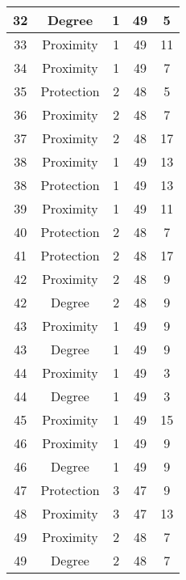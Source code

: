 \documentclass[results.tex]{subfiles}
\begin{document}
\begin{center}
\begin{tabular}{| c || c | c | c | c |}
    \hline
    32 & Degree & 1 & 49 & 5 \\ 
    \hline
    33 & Proximity & 1 & 49 & 11 \\ 
    \hline
    34 & Proximity & 1 & 49 & 7 \\ 
    \hline
    35 & Protection & 2 & 48 & 5 \\ 
    \hline
    36 & Proximity & 2 & 48 & 7 \\ 
    \hline
    37 & Proximity & 2 & 48 & 17 \\ 
    \hline
    38 & Proximity & 1 & 49 & 13 \\ 
    \hline
    38 & Protection & 1 & 49 & 13 \\ 
    \hline
    39 & Proximity & 1 & 49 & 11 \\ 
    \hline
    40 & Protection & 2 & 48 & 7 \\ 
    \hline
    41 & Protection & 2 & 48 & 17 \\ 
    \hline
    42 & Proximity & 2 & 48 & 9 \\ 
    \hline
    42 & Degree & 2 & 48 & 9 \\ 
    \hline
    43 & Proximity & 1 & 49 & 9 \\ 
    \hline
    43 & Degree & 1 & 49 & 9 \\ 
    \hline
    44 & Proximity & 1 & 49 & 3 \\ 
    \hline
    44 & Degree & 1 & 49 & 3 \\ 
    \hline
    45 & Proximity & 1 & 49 & 15 \\ 
    \hline
    46 & Proximity & 1 & 49 & 9 \\ 
    \hline
    46 & Degree & 1 & 49 & 9 \\ 
    \hline
    47 & Protection & 3 & 47 & 9 \\ 
    \hline
    48 & Proximity & 3 & 47 & 13 \\ 
    \hline
    49 & Proximity & 2 & 48 & 7 \\ 
    \hline
    49 & Degree & 2 & 48 & 7 \\ 
    \hline   \end{tabular}
\end{center}
\end{document}

